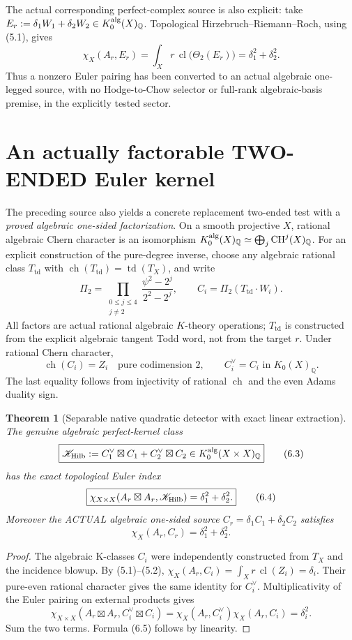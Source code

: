 \documentclass[11pt]{article}
\newcommand{\Q}{\mathbb Q}
\newcommand{\CH}{\operatorname{CH}}
\newcommand{\ch}{\operatorname{ch}}
\newcommand{\td}{\operatorname{td}}
\newcommand{\cl}{\operatorname{cl}}
\newtheorem{theorem}{Theorem}[section]
\begin{document}
The actual corresponding perfect-complex source is also explicit:
take \(E_r:=\delta_1W_1+\delta_2W_2\in K_0^{\rm alg}(X)_{\Q}\).
Topological Hirzebruch--Riemann--Roch, using (5.1), gives
\[
 \boxed{\chi_X(A_r,E_r)
     =\int_Xr\,\cl\bigl(\Theta_2(E_r)\bigr)
     =\delta_1^2+\delta_2^2.}                      \tag{5.6}
\]
Thus a nonzero Euler pairing has been converted to an actual
algebraic one-legged source, with no Hodge-to-Chow selector or
full-rank algebraic-basis premise, in the explicitly tested sector.

\section{An actually factorable TWO-ENDED Euler kernel}
The preceding source also yields a concrete replacement
two-ended test with a \emph{proved algebraic one-sided
factorization}. On a smooth projective \(X\), rational algebraic
Chern character is an isomorphism
\(K_0^{\rm alg}(X)_{\Q}\simeq\bigoplus_j\CH^j(X)_{\Q}\).
For an explicit construction of the pure-degree inverse, choose
any algebraic rational class \(T_{\td}\) with
\(\ch(T_{\td})=\td(T_X)\), and write
\[
 \Pi_2=\prod_{\substack{0\le j\le4\\j\ne2}}
        \frac{\psi^2-2^j}{2^2-2^j},
 \qquad
 C_i=\Pi_2(T_{\td}\cdot W_i).                        \tag{6.1}
\]
All factors are actual rational algebraic \(K\)-theory operations;
\(T_{\td}\) is constructed from the explicit algebraic tangent
Todd word, not from the target \(r\). Under rational Chern
character,
\[
            \ch(C_i)=Z_i\quad\text{pure codimension }2,
            \qquad C_i^\vee=C_i\text{ in }K_0(X)_\Q. \tag{6.2}
\]
The last equality follows from injectivity of rational \(\ch\)
and the even Adams duality sign.

\begin{theorem}[Separable native quadratic detector with exact linear extraction]
The genuine algebraic perfect-kernel class
\[
 \boxed{\mathscr K_{\rm Hilb}
   := C_1^\vee\boxtimes C_1+C_2^\vee\boxtimes C_2
      \in K_0^{\rm alg}(X\times X)_{\Q}}            \tag{6.3}
\]
has the exact topological Euler index
\[
 \boxed{
 \chi_{X\times X}(A_r\boxtimes A_r,\mathscr K_{\rm Hilb})
   =\delta_1^2+\delta_2^2.}                        \tag{6.4}
\]
Moreover the ACTUAL algebraic one-sided source
\(
 C_r=\delta_1C_1+\delta_2C_2
\)
satisfies
\[
 \boxed{\chi_X(A_r,C_r)=\delta_1^2+\delta_2^2.}     \tag{6.5}
\]
\end{theorem}
\begin{proof}
The algebraic K-classes \(C_i\) were independently constructed
from \(T_X\) and the incidence blowup. By (5.1)--(5.2),
\(\chi_X(A_r,C_i)=\int_Xr\,\cl(Z_i)=\delta_i\).
Their pure-even rational character gives the same identity for
\(C_i^\vee\). Multiplicativity of the Euler pairing on external
products gives
\[
 \chi_{X\times X}(A_r\boxtimes A_r,C_i^\vee\boxtimes C_i)
  =\chi_X(A_r,C_i^\vee)\chi_X(A_r,C_i)=\delta_i^2.
\]
Sum the two terms. Formula (6.5) follows by linearity.
\end{proof}
\end{document}
